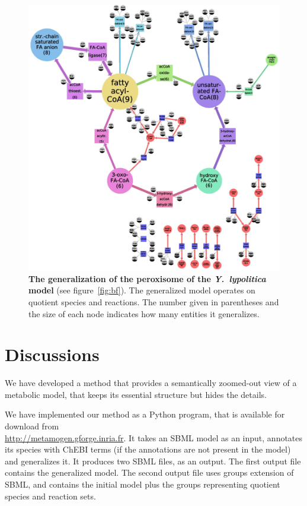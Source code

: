 \documentclass[9pt]{article}
\newcounter{fig}
\newcounter{rm}
\begin{document}
\begin{figure}[th]
\centerline{\includegraphics{../pics/Zhukova_Fig_3.eps}}
\vspace*{8pt}
\caption{\textbf{The generalization of the peroxisome of the \textit{Y.~lypolitica} model} (see figure~\ref{fig:bf}). The generalized model operates on quotient species and reactions. The number given in parentheses and the size of each node indicates how many entities it generalizes.}
\label{fig:yali}
\end{figure}

\newpage
\section*{Discussions}

We have developed a method that provides a semantically zoomed-out view of a metabolic model, that keeps its essential structure but hides the details. 

We have implemented our method as a Python program, that is available for download from\\ \url{http://metamogen.gforge.inria.fr}. It takes an SBML model as an input, annotates its species with ChEBI terms (if the annotations are not present in the model) and generalizes it. It produces two SBML files, as an output. The first output file contains the generalized model. The second output file uses groups\citep{Hucka2012} extension of SBML, and contains the initial model plus the groups representing quotient species and reaction sets.
\end{document}
